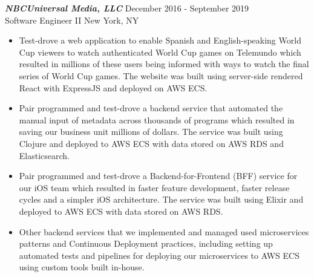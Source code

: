 {\sl \textbf{NBCUniversal Media, LLC}} \hfill December 2016 - September 2019 \\ Software Engineer II \hfill New York, NY
\begin{itemize}
    \item Test-drove a web application to enable Spanish and English-speaking World Cup viewers to watch authenticated World Cup games on Telemundo which resulted in millions of these users being informed with ways to watch the final series of World Cup games. The website was built using server-side rendered React with ExpressJS and deployed on AWS ECS.
    \item Pair programmed and test-drove a backend service that automated the manual input of metadata across thousands of programs which resulted in saving our business unit millions of dollars. The service was built using Clojure and deployed to AWS ECS with data stored on AWS RDS and Elasticsearch.
    \item Pair programmed and test-drove a Backend-for-Frontend (BFF) service for our iOS team which resulted in faster feature development, faster release cycles and a simpler iOS architecture. The service was built using Elixir and deployed to AWS ECS with data stored on AWS RDS.
    \item Other backend services that we implemented and managed used microservices patterns and Continuous Deployment practices, including setting up automated tests and pipelines for deploying our microservices to AWS ECS using custom tools built in-house.
\end{itemize}
